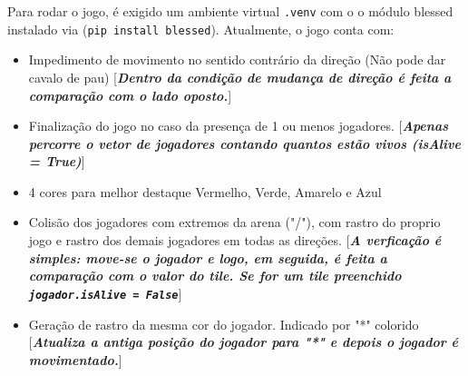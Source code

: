 \documentclass{cisXXX} %
\begin{document}
            Para rodar o jogo, é exigido um ambiente virtual \texttt{.venv} com o o módulo blessed instalado via (\texttt{pip install blessed}). Atualmente, o jogo conta com:
            \begin{itemize}
                \item Impedimento de movimento no sentido contrário da direção (Não pode dar cavalo de pau) [\textbf{\textit{Dentro da condição de mudança de direção é feita a comparação com o lado oposto.}}]
                \item Finalização do jogo no caso da presença de 1 ou menos jogadores. [\textbf{\textit{Apenas percorre o vetor de jogadores contando quantos estão vivos (isAlive = True)}}]
                \item 4 cores para melhor destaque Vermelho, Verde, Amarelo e Azul
                \item Colisão dos jogadores com extremos da arena ("/"), com rastro do proprio jogo e rastro dos demais jogadores em todas as direções. [\textbf{\textit{A verficação é simples: move-se o jogador e logo, em seguida, é feita a comparação com o valor do tile. Se for um tile preenchido \texttt{jogador.isAlive = False}}}]
                \item Geração de rastro da mesma cor do jogador. Indicado por "*" colorido [\textit{\textbf{Atualiza a antiga posição do jogador para "*" e depois o jogador é movimentado.}}]
            \end{itemize}
    
\end{document}
